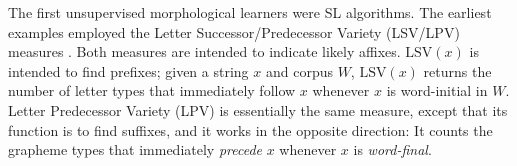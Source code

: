 The first unsupervised morphological learners were SL algorithms. The earliest examples employed the 
Letter Successor/Predecessor Variety (LSV/LPV) measures \citep{harris:1955, harris:1967}. 
Both measures are intended to indicate likely affixes.
$\text{LSV}(x)$ is intended to find prefixes; given a string $x$ and corpus $W$, 
$\text{LSV}(x)$ returns the number of letter types that immediately follow $x$ whenever $x$ is word-initial in $W$.
Letter Predecessor Variety (LPV) is essentially the same measure, except that its function is to find suffixes,
and it works in the opposite direction:
It counts the grapheme types that immediately \emph{precede} $x$ whenever $x$ is \emph{word-final}.


%

